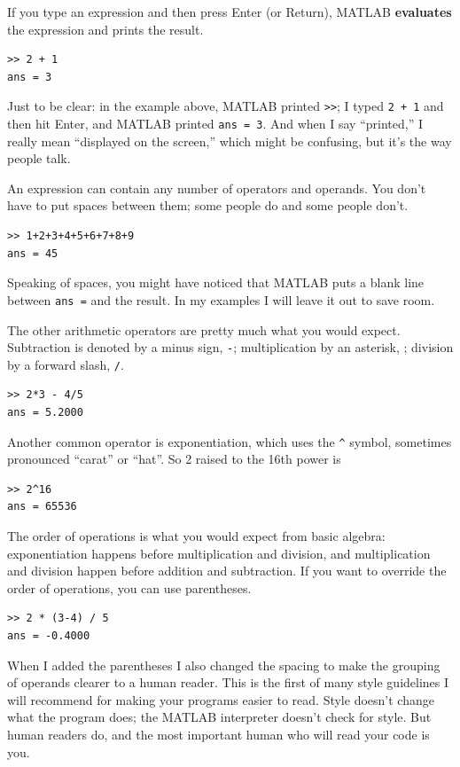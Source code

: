 \documentclass{book}
\begin{document}
If you type an expression and then press Enter (or Return), MATLAB
{\bf evaluates} the expression and prints the result.

\begin{verbatim}
>> 2 + 1
ans = 3
\end{verbatim}

Just to be clear: in the example above, MATLAB printed {\tt >>}; I
typed {\tt 2 + 1} and then hit Enter, and MATLAB printed {\tt ans = 3}.
And when I say ``printed,'' I really mean ``displayed on the screen,''
which might be confusing, but it's the way people talk.

An expression can contain any number of operators and operands.  You
don't have to put spaces between them; some people do and some people
don't.

\begin{verbatim}
>> 1+2+3+4+5+6+7+8+9
ans = 45
\end{verbatim}

Speaking of spaces, you might have noticed that MATLAB puts a blank
line between {\tt ans =} and the result.  In my examples I will leave
it out to save room.

The other arithmetic operators are pretty much what you would expect.
Subtraction is denoted by a minus sign, {\tt -}; multiplication by
an asterisk, {\tt *}; division by a forward slash, {\tt /}.

\begin{verbatim}
>> 2*3 - 4/5
ans = 5.2000
\end{verbatim}

Another common operator is exponentiation, which uses the \verb+^+
symbol, sometimes pronounced ``carat'' or ``hat''.  So 2 raised to the
16th power is

\begin{verbatim}
>> 2^16
ans = 65536
\end{verbatim}

The order of operations is what you would expect from basic algebra:
exponentiation happens before multiplication
and division, and
multiplication and division happen before addition and subtraction.
If you want to override the order of operations, you can use parentheses.

\begin{verbatim}
>> 2 * (3-4) / 5
ans = -0.4000
\end{verbatim}

When I added the parentheses I also changed the spacing to make the
grouping of operands clearer to a human reader.  This is the first
of many style guidelines I will recommend for making your programs
easier to read.  Style doesn't change what the program does; the MATLAB
interpreter doesn't check for style.  But human readers do, and the
most important human who will read your code is you.
\end{document}
